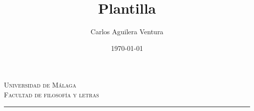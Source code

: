 \documentclass[a4paper]{article}
\title{Plantilla}
\author{Carlos Aguilera Ventura}
\date{\today}
\begin{document}
\begin{titlepage}
\centering
{ \Huge \textsc{Universidad de Málaga}} \\
\vspace{1cm}
{\Large \textsc{Facultad de filosofía y letras}} \\
\vspace{1cm}
\rule{2cm}{0.5mm}

\end{titlepage}
\end{document}
